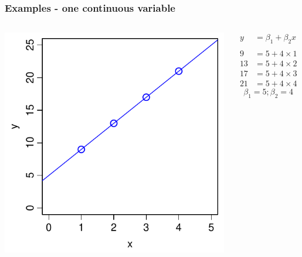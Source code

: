 \documentclass[aspectratio=43]{beamer}
\begin{document}
\frame
{\frametitle{Examples - one continuous variable}

\begin{columns}[T]

		\includegraphics[width=\textwidth]{Intercept.pdf}
		
		\begin{align*}
		  y  &= \beta_1 + \beta_2 x \\
		  \\
		  9  &= 5 + 4 \times 1 \\
		  13 &= 5 + 4 \times 2 \\
		  17 &= 5 + 4 \times 3 \\
		  21 &= 5 + 4 \times 4   
		\end{align*}
        \[\beta_1 = 5; \beta_2=4\]
\end{columns}
}
\end{document}
